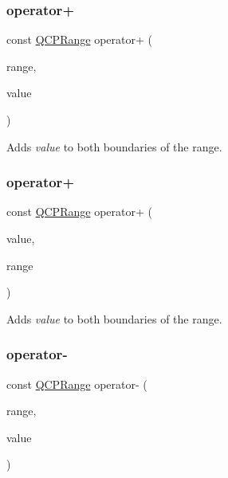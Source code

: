 \subsubsection{\texorpdfstring{operator+}{operator+}\hspace{0.1cm}{\footnotesize\ttfamily [1/2]}}
{\footnotesize\ttfamily const \hyperlink{class_q_c_p_range}{Q\+C\+P\+Range} operator+ (\begin{DoxyParamCaption}\item[{const \hyperlink{class_q_c_p_range}{Q\+C\+P\+Range} \&}]{range,  }\item[{double}]{value }\end{DoxyParamCaption})\hspace{0.3cm}{\ttfamily [friend]}}

Adds {\itshape value} to both boundaries of the range. \hypertarget{class_q_c_p_range_a9fb2e9941d32001482df670c0d704977}{}\label{class_q_c_p_range_a9fb2e9941d32001482df670c0d704977} 
\subsubsection{\texorpdfstring{operator+}{operator+}\hspace{0.1cm}{\footnotesize\ttfamily [2/2]}}
{\footnotesize\ttfamily const \hyperlink{class_q_c_p_range}{Q\+C\+P\+Range} operator+ (\begin{DoxyParamCaption}\item[{double}]{value,  }\item[{const \hyperlink{class_q_c_p_range}{Q\+C\+P\+Range} \&}]{range }\end{DoxyParamCaption})\hspace{0.3cm}{\ttfamily [friend]}}

Adds {\itshape value} to both boundaries of the range. \hypertarget{class_q_c_p_range_a797f82830b516646da8873f82e39e356}{}\label{class_q_c_p_range_a797f82830b516646da8873f82e39e356} 
\subsubsection{\texorpdfstring{operator-\/}{operator-}}
{\footnotesize\ttfamily const \hyperlink{class_q_c_p_range}{Q\+C\+P\+Range} operator-\/ (\begin{DoxyParamCaption}\item[{const \hyperlink{class_q_c_p_range}{Q\+C\+P\+Range} \&}]{range,  }\item[{double}]{value }\end{DoxyParamCaption})\hspace{0.3cm}{\ttfamily [friend]}}

